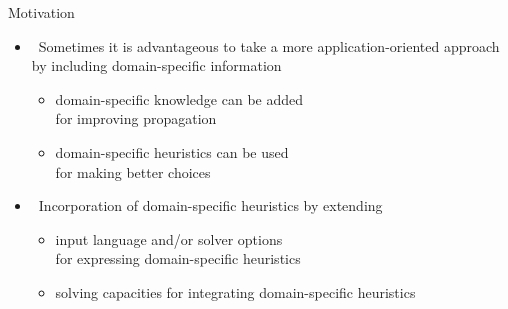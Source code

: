 \begin{frame}[c]{Motivation}
  \begin{itemize}
  \item<1->  \
    Sometimes it is advantageous to take a more application-oriented approach by including
    domain-specific information
    \begin{itemize}\normalsize
    \item \alert<2>{domain-specific knowledge} can be added\\ for improving propagation
    \item \alert<2>{domain-specific heuristics} can be used\\ for making better choices
    \end{itemize}
    \medskip
  \item<3->  \ \alert<3->{Incorporation of domain-specific heuristics} by extending
    \begin{itemize}
    \item input language and/or solver options\\ for expressing domain-specific heuristics
    \item solving capacities for integrating domain-specific heuristics
    \end{itemize}
  \end{itemize}
\end{frame}
%
